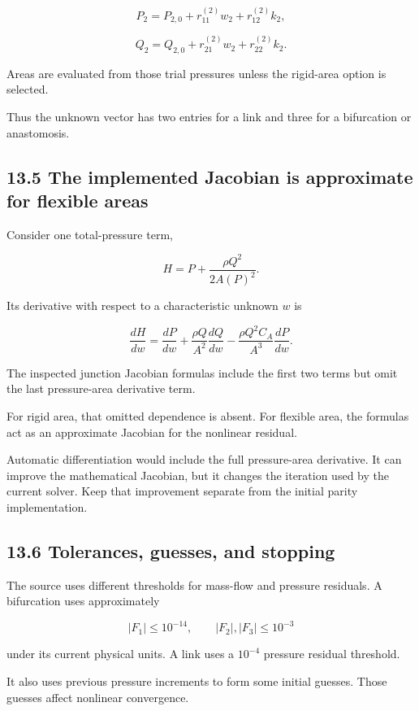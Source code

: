 \documentclass[11pt,a4paper]{article}
\begin{document}
\begingroup\small
\[
P_2=P_{2,0}+r_{11}^{(2)}w_2+r_{12}^{(2)}k_2,
\]
\endgroup



\begingroup\small
\[
Q_2=Q_{2,0}+r_{21}^{(2)}w_2+r_{22}^{(2)}k_2.
\]
\endgroup


Areas are evaluated from those trial pressures unless the rigid-area option is selected.

Thus the unknown vector has two entries for a link and three for a bifurcation or anastomosis.

\subsection{13.5 The implemented Jacobian is approximate for flexible areas}
Consider one total-pressure term,


\begingroup\small
\[
H=P+\frac{\rho Q^2}{2A(P)^2}.
\]
\endgroup


Its derivative with respect to a characteristic unknown \(w\) is


\begingroup\small
\[
\frac{dH}{dw}
=
\frac{dP}{dw}
+\frac{\rho Q}{A^2}\frac{dQ}{dw}
-\frac{\rho Q^2C_A}{A^3}\frac{dP}{dw}.
\]
\endgroup


The inspected junction Jacobian formulas include the first two terms but omit the last pressure-area derivative term.

For rigid area, that omitted dependence is absent. For flexible area, the formulas act as an approximate Jacobian for the nonlinear residual.

Automatic differentiation would include the full pressure-area derivative. It can improve the mathematical Jacobian, but it changes the iteration used by the current solver. Keep that improvement separate from the initial parity implementation.

\subsection{13.6 Tolerances, guesses, and stopping}
The source uses different thresholds for mass-flow and pressure residuals. A bifurcation uses approximately


\begingroup\small
\[
|F_1|\leq10^{-14},
\qquad |F_2|,|F_3|\leq10^{-3}
\]
\endgroup


under its current physical units. A link uses a \(10^{-4}\) pressure residual threshold.

It also uses previous pressure increments to form some initial guesses. Those guesses affect nonlinear convergence.
\end{document}
